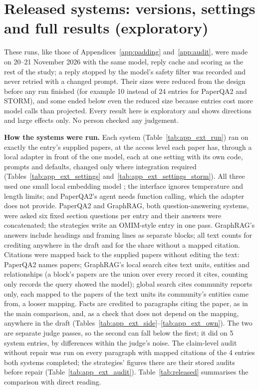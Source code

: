 \documentclass{article} %
\begin{document}
\section{Released systems: versions, settings and full results (exploratory)}
\label{app:released}
These runs, like those of Appendices~\ref{app:padding} and~\ref{app:audit}, were made on 20--21 November 2026 with the same model, reply cache and scoring as the rest of the study; a reply stopped by the model's safety filter was recorded and never retried with a changed prompt. Their sizes were reduced from the design before any run finished (for example 10 instead of 24 entries for PaperQA2 and STORM), and some ended below even the reduced size because entries cost more model calls than projected. Every result here is exploratory and shows directions and large effects only. No person checked any judgement.

\textbf{How the systems were run.} Each system (Table~\ref{tab:app_ext_run}) ran on exactly the entry's supplied papers, at the access level each paper has, through a local adapter in front of the one model, each at one setting with its own code, prompts and defaults, changed only where integration required (Tables~\ref{tab:app_ext_settings} and~\ref{tab:app_ext_settings_storm}). All three used one small local embedding model \citep{Xiao2023CpackPacked}; the interface ignores temperature and length limits; and PaperQA2's agent needs function calling, which the adapter does not provide. PaperQA2 and GraphRAG, both question-answering systems, were asked six fixed section questions per entry and their answers were concatenated; the strategies write an OMIM-style entry in one pass. GraphRAG's answers include headings and framing lines as separate blocks; all text counts for crediting anywhere in the draft and for the share without a mapped citation. Citations were mapped back to the supplied papers without editing the text: PaperQA2 names papers; GraphRAG's local search cites text units, entities and relationships (a block's papers are the union over every record it cites, counting only records the query showed the model); global search cites community reports only, each mapped to the papers of the text units its community's entities came from, a looser mapping. Facts are credited to paragraphs citing the paper, as in the main comparison, and, as a check that does not depend on the mapping, anywhere in the draft (Tables~\ref{tab:app_ext_side}--\ref{tab:app_ext_own}). The two are separate judge passes, so the second can fall below the first; it did on 5 system entries, by differences within the judge's noise. The claim-level audit without repair was run on every paragraph with mapped citations of the 4 entries both systems completed; the strategies' figures there are their stored audits before repair (Table~\ref{tab:app_ext_audit}). Table~\ref{tab:released} summarises the comparison with direct reading.
\end{document}
